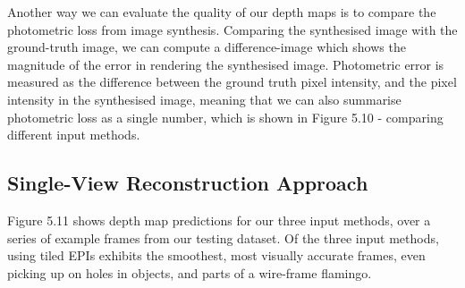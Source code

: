 Another way we can evaluate the quality of our depth maps is to compare the photometric loss from image synthesis. Comparing the synthesised image with the ground-truth image, we can compute a difference-image which shows the magnitude of the error in rendering the synthesised image. Photometric error is measured as the difference between the ground truth pixel intensity, and the pixel intensity in the synthesised image, meaning that we can also summarise photometric loss as a single number, which is shown in Figure 5.10 - comparing different input methods.

\subsection{Single-View Reconstruction Approach}
Figure 5.11 shows depth map predictions for our three input methods, over a series of example frames from our testing dataset. Of the three input methods, using tiled EPIs exhibits the smoothest, most visually accurate frames, even picking up on holes in objects, and parts of a wire-frame flamingo.
